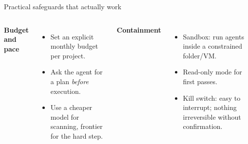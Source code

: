 \begin{frame}{Practical safeguards that actually work}
  \begin{columns}[T,onlytextwidth]
      \textbf{Budget and pace}
      \begin{itemize}\setlength\itemsep{0.3em}
        \item Set an explicit monthly budget per project.
        \item Ask the agent for a plan \emph{before} execution.
        \item Use a cheaper model for scanning, frontier for the hard step.
      \end{itemize}
      \textbf{Containment}
      \begin{itemize}\setlength\itemsep{0.3em}
        \item Sandbox: run agents inside a constrained folder/VM.
        \item Read-only mode for first passes.
        \item Kill switch: easy to interrupt; nothing irreversible without confirmation.
      \end{itemize}
  \end{columns}
  \vspace{0.4cm}
\end{frame}
